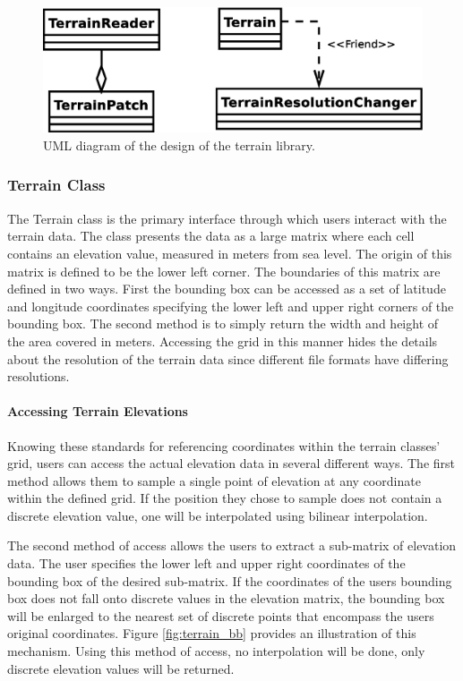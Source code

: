 \begin{figure}[ht]
\begin{center}
		\includegraphics[scale=0.45]{images/network_vis/terrain_lib_diagram.eps}
\end{center}
\caption{UML diagram of the design of the terrain library.}
\label{fig:terrain_lib_diagram}
\end{figure}

\subsubsection{Terrain Class}
The Terrain class is the primary interface through which users interact with the terrain data.  The class presents the data as a large matrix where each cell contains an elevation value, measured in meters from sea level.  The origin of this matrix is defined to be the lower left corner.  The boundaries of this matrix are defined in two ways.  First the bounding box can be accessed as a set of latitude and longitude coordinates specifying the lower left and upper right corners of the bounding box.  The second method is to simply return the width and height of the area covered in meters.  Accessing the grid in this manner hides the details about the resolution of the terrain data since different file formats have differing resolutions.

\paragraph{Accessing Terrain Elevations}
Knowing these standards for referencing coordinates within the terrain classes' grid, users can access the actual elevation data in several different ways.  The first method allows them to sample a single point of elevation at any coordinate within the defined grid.  If the position they chose to sample does not contain a discrete elevation value, one will be interpolated using bilinear interpolation.

The second method of access allows the users to extract a sub-matrix of elevation data.  The user specifies the lower left and upper right coordinates of the bounding box of the desired sub-matrix.  If the coordinates of the users bounding box does not fall onto discrete values in the elevation matrix, the bounding box will be enlarged to the nearest set of discrete points that encompass the users original coordinates.  Figure \ref{fig:terrain_bb} provides an illustration of this mechanism.  Using this method of access, no interpolation will be done, only discrete elevation values will be returned.

